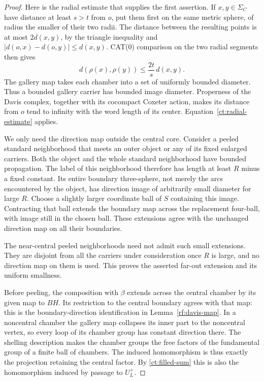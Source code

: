 \begin{proof}
Here is the radial estimate that supplies the first assertion.  If
$x,y\in\Sigma_C$ have distance at least $s>t$ from $o$, put them first
on the same metric sphere, of radius the smaller of their two radii.
The distance between the resulting points is at most $2d(x,y)$,
by the triangle inequality and
$|d(o,x)-d(o,y)|\leq d(x,y)$.  CAT(0) comparison on the two radial
segments then gives
\begin{equation}\label{ct:radial-estimate}
                  d(\rho(x),\rho(y))
                  \leq \frac{2t}{s}\,d(x,y).
\end{equation}
The gallery map takes each chamber into a set of uniformly bounded
diameter.  Thus a bounded gallery carrier has bounded image diameter.
Properness of the Davis complex, together with its cocompact Coxeter
action, makes its distance from $o$ tend to infinity with the word
length of its center.  Equation~\eqref{ct:radial-estimate} applies.

We only need the direction map outside the central core.  Consider a
peeled standard neighborhood that meets an outer object or any of
its fixed enlarged carriers.  Both the object and the whole standard
neighborhood have bounded propagation.  The label of this neighborhood
therefore has length at least $R$ minus a fixed constant.  Its entire
boundary three-sphere, not merely the arcs encountered by the object,
has direction image of arbitrarily small diameter for large $R$.
Choose a slightly larger coordinate ball of $S$ containing this image.
Contracting that ball extends the boundary map across the replacement
four-ball, with image still in the chosen ball.  These extensions
agree with the unchanged direction map on all their boundaries.

The near-central peeled neighborhoods need not admit such small
extensions.  They are disjoint from all the carriers under consideration
once $R$ is large, and no direction map on them is used.  This proves
the asserted far-out extension and its uniform smallness.

Before peeling, the composition with $\beta$ extends across the
central chamber by its given map to $BH$.  Its restriction to the
central boundary agrees with that map: this is the boundary-direction
identification in Lemma~\ref{rf:davis-map}.  In a noncentral chamber
the gallery map collapses its inner part to the noncentral vertex,
so every loop of its chamber group has constant direction there.
The shelling description makes the chamber groups the free factors
of the fundamental group of a finite ball of chambers.  The induced
homomorphism is thus exactly the projection retaining the central
factor.  By \eqref{ct:filled-sum} this is also the homomorphism induced
by passage to $U_L^+$.


\end{proof}
